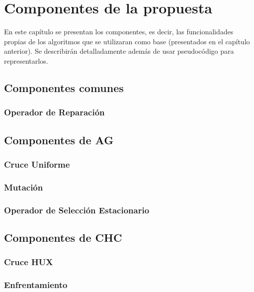 \chapter{Componentes de la propuesta}

En este capítulo se presentan los componentes, es decir, las funcionalidades propias de los algoritmos que se utilizaran como base (presentados en el capítulo anterior). 
Se describirán detalladamente además de usar pseudocódigo para representarlos.

\section{Componentes comunes}

\subsection{Operador de Reparación}

\section{Componentes de AG}

\subsection{Cruce Uniforme}

\subsection{Mutación}

\subsection{Operador de Selección Estacionario}

\section{Componentes de CHC}

\subsection{Cruce HUX}

\subsection{Enfrentamiento}